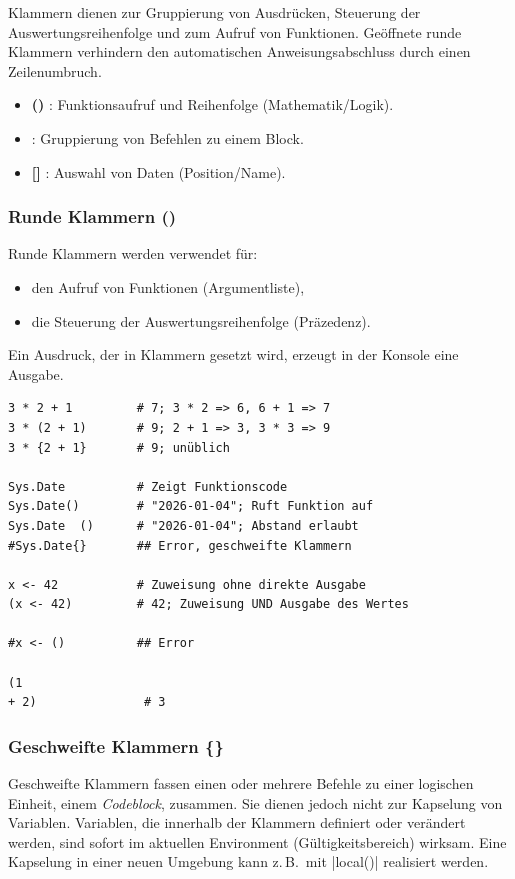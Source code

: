 \documentclass[10pt,twocolumn]{scrartcl}
\renewcommand{\lstinline}{\mycoloredinline}
\begin{document}
Klammern dienen zur Gruppierung von Ausdrücken, Steuerung der Auswertungsreihenfolge und zum Aufruf von Funktionen. Geöffnete runde Klammern verhindern den automatischen Anweisungsabschluss durch einen Zeilenumbruch.

\begin{itemize}
\item \textbf{()} : Funktionsaufruf und Reihenfolge (Mathematik/Logik).
\item \textbf{{}} : Gruppierung von Befehlen zu einem Block.
\item \textbf{[]} : Auswahl von Daten (Position/Name).
\end{itemize}

\subsubsection{Runde Klammern ()}

Runde Klammern werden verwendet für:
\begin{itemize}
\item den Aufruf von Funktionen (Argumentliste),
\item die Steuerung der Auswertungsreihenfolge (Präzedenz).
\end{itemize}

Ein Ausdruck, der in Klammern gesetzt wird, erzeugt in der Konsole eine Ausgabe.

\begin{lstlisting}
3 * 2 + 1         # 7; 3 * 2 => 6, 6 + 1 => 7
3 * (2 + 1)       # 9; 2 + 1 => 3, 3 * 3 => 9
3 * {2 + 1}       # 9; unüblich

Sys.Date          # Zeigt Funktionscode
Sys.Date()        # "2026-01-04"; Ruft Funktion auf
Sys.Date  ()      # "2026-01-04"; Abstand erlaubt
#Sys.Date{}       ## Error, geschweifte Klammern

x <- 42           # Zuweisung ohne direkte Ausgabe
(x <- 42)         # 42; Zuweisung UND Ausgabe des Wertes

#x <- ()          ## Error

(1
+ 2)               # 3
\end{lstlisting}

\subsubsection{Geschweifte Klammern \{\}}

Geschweifte Klammern fassen einen oder mehrere Befehle zu einer logischen Einheit, einem \emph{Codeblock}, zusammen. Sie dienen jedoch nicht zur Kapselung von Variablen. Variablen, die innerhalb der Klammern definiert oder verändert werden, sind sofort im aktuellen Environment (Gültigkeitsbereich) wirksam. Eine Kapselung in einer neuen Umgebung kann z.\,B.\ mit \lstinline|local()| realisiert werden.
\end{document}
